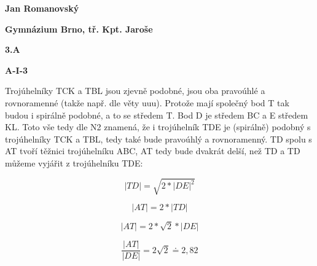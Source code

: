 \documentclass{article}
\title{\vspace{-2cm}\vspace{-1.7cm}}
\date{}
\author{}
\begin{document}
\maketitle
\noindent \textbf{Jan Romanovský}

\noindent \textbf{Gymnázium Brno, tř. Kpt. Jaroše}

\noindent \textbf{3.A}

\noindent \textbf{A-\textrm{I}-3}

\textbf{ }

Trojúhelníky TCK a TBL jsou zjevně podobné, jsou oba pravoúhlé a rovnoramenné (takže např. dle věty uuu). Protože mají společný bod T tak budou i spirálně podobné, a to se středem T. Bod D je středem BC a E středem KL. Toto vše tedy dle N2 znamená, že i trojúhelník TDE je (spirálně) podobný s trojúhelníky TCK a TBL, tedy také bude pravoúhlý a rovnoramenný. TD spolu s AT tvoří těžnici trojúhelníku ABC, AT tedy bude dvakrát delší, než TD a TD můžeme vyjářit z trojúhelníku TDE:

  \[|TD|=\sqrt{2*|DE|^2}\]

  \[|AT|=2*|TD|\]

  \[|AT|=2*\sqrt{2}*|DE|\]

  \[\frac{|AT|}{|DE|}=2\sqrt{2}\doteq2,82\]
\end{document}
